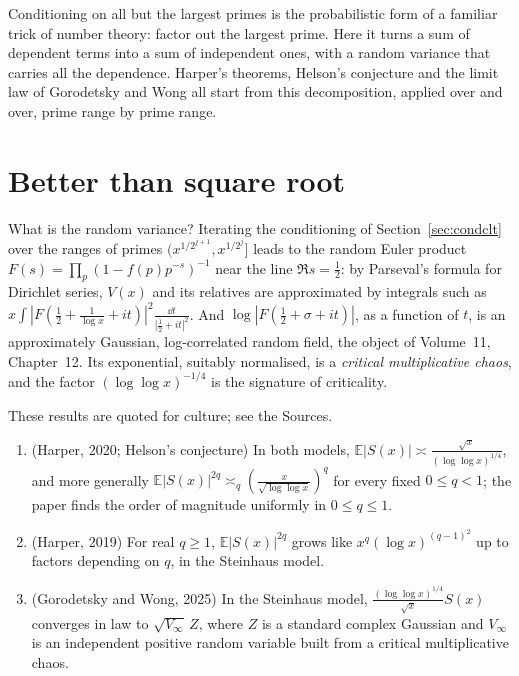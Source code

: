 \begin{beauty}
Conditioning on all but the largest primes is the probabilistic form of a familiar trick of number theory: factor out the largest prime. Here it turns a sum of dependent terms into a sum of independent ones, with a random variance that carries all the dependence. Harper's theorems, Helson's conjecture and the limit law of Gorodetsky and Wong all start from this decomposition, applied over and over, prime range by prime range.
\end{beauty}

\section{Better than square root}

What is the random variance? Iterating the conditioning of Section~\ref{sec:condclt} over the ranges of primes $(x^{1/2^{j+1}},x^{1/2^j}]$ leads to the random Euler product $F(s)=\prod_{p}(1-f(p)p^{-s})^{-1}$ near the line $\Re s=\frac12$: by Parseval's formula for Dirichlet series, $V(x)$ and its relatives are approximated by integrals such as $x\int|F(\frac12+\frac1{\log x}+it)|^2\frac{\dd t}{|\frac12+it|^2}$. And $\log|F(\frac12+\sigma+it)|$, as a function of $t$, is an approximately Gaussian, log-correlated random field, the object of Volume~11, Chapter~12. Its exponential, suitably normalised, is a \emph{critical multiplicative chaos}, and the factor $(\log\log x)^{-1/4}$ is the signature of criticality.

\begin{remark}
These results are quoted for culture; see the Sources.
\begin{enumerate}[label=(\alph*)]
\item (Harper, 2020; Helson's conjecture) In both models, $\mathbb E|S(x)|\asymp\frac{\sqrt x}{(\log\log x)^{1/4}}$, and more generally $\mathbb E|S(x)|^{2q}\asymp_q(\frac x{\sqrt{\log\log x}})^q$ for every fixed $0\le q<1$; the paper finds the order of magnitude uniformly in $0\le q\le1$.
\item (Harper, 2019) For real $q\ge1$, $\mathbb E|S(x)|^{2q}$ grows like $x^q(\log x)^{(q-1)^2}$ up to factors depending on $q$, in the Steinhaus model.
\item (Gorodetsky and Wong, 2025) In the Steinhaus model, $\frac{(\log\log x)^{1/4}}{\sqrt x}S(x)$ converges in law to $\sqrt{V_\infty}\,Z$, where $Z$ is a standard complex Gaussian and $V_\infty$ is an independent positive random variable built from a critical multiplicative chaos.
\end{enumerate}
\end{remark}

